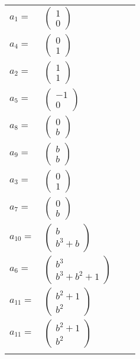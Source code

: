 \documentclass[1p]{elsarticle_modified}
\theoremstyle{definition}
\begin{document}
\begin{tabular}{m{7pt} m{180pt} m{7pt} m{180pt} }
\flushright $a_{1}=$&$\begin{pmatrix}1\\0\end{pmatrix}$ \\
\flushright $a_{4}=$&$\begin{pmatrix}0\\1\end{pmatrix}$ \\
\flushright $a_{2}=$&$\begin{pmatrix}1\\1\end{pmatrix}$ \\
\flushright $a_{5}=$&$\begin{pmatrix}-1\\0\end{pmatrix}$ \\
\flushright $a_{8}=$&$\begin{pmatrix}0\\b\end{pmatrix}$ \\
\flushright $a_{9}=$&$\begin{pmatrix}b\\b\end{pmatrix}$ \\
\flushright $a_{3}=$&$\begin{pmatrix}0\\1\end{pmatrix}$ \\
\flushright $a_{7}=$&$\begin{pmatrix}0\\b\end{pmatrix}$ \\
\flushright $a_{10}=$&$\begin{pmatrix}b\\b^3+b\end{pmatrix}$ \\
\flushright $a_{6}=$&$\begin{pmatrix}b^3\\b^3+b^2+1\end{pmatrix}$ \\
\flushright $a_{11}=$&$\begin{pmatrix}b^2+1\\b^2\end{pmatrix}$\\ \flushright $a_{11}=$&$\begin{pmatrix}b^2+1\\b^2\end{pmatrix}$\\&\end{tabular}
\end{document}
